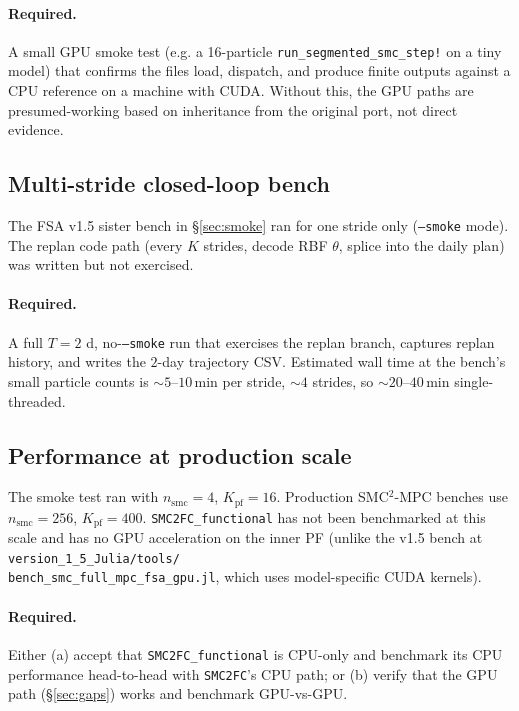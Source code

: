 \documentclass[11pt,a4paper]{article}
\begin{document}
\paragraph{Required.} A small GPU smoke test (e.g. a 16-particle
\texttt{run\_segmented\_smc\_step!} on a tiny model) that confirms the
files load, dispatch, and produce finite outputs against a CPU reference
on a machine with CUDA. Without this, the GPU paths are presumed-working
based on inheritance from the original port, not direct evidence.

\subsection{Multi-stride closed-loop bench}
The FSA v1.5 sister bench in \S\ref{sec:smoke} ran for one stride only
(\texttt{--smoke} mode). The replan code path (every $K$ strides, decode
RBF $\theta$, splice into the daily plan) was written but not exercised.

\paragraph{Required.} A full $T{=}2$ d, no-\texttt{--smoke} run that
exercises the replan branch, captures replan history, and writes the
$2$-day trajectory CSV. Estimated wall time at the bench's small particle
counts is $\sim 5$--$10$\,min per stride, $\sim 4$ strides, so
$\sim 20$--$40$\,min single-threaded.

\subsection{Performance at production scale}
The smoke test ran with $n_{\mathrm{smc}}{=}4$, $K_{\mathrm{pf}}{=}16$.
Production SMC$^2$-MPC benches use $n_{\mathrm{smc}}{=}256$,
$K_{\mathrm{pf}}{=}400$. \texttt{SMC2FC\_functional} has not been
benchmarked at this scale and has no GPU acceleration on the inner PF
(unlike the v1.5 bench at
\texttt{version\_1\_5\_Julia/tools/}\\\texttt{bench\_smc\_full\_mpc\_fsa\_gpu.jl},
which uses model-specific CUDA kernels).

\paragraph{Required.} Either (a) accept that
\texttt{SMC2FC\_functional} is CPU-only and benchmark its CPU performance
head-to-head with \texttt{SMC2FC}'s CPU path; or (b) verify that the GPU
path (\S\ref{sec:gaps}) works and benchmark GPU-vs-GPU.
\end{document}
